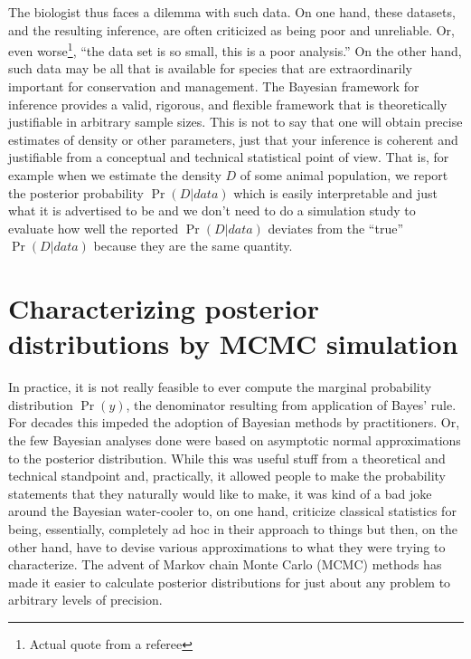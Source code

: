 The biologist thus faces a dilemma with such data. On one hand, these
datasets, and the resulting inference, are often criticized as being
poor and unreliable. Or, even worse\footnote{Actual quote from a
  referee}, ``the data set is so small, this is a poor analysis.''  On
the other hand, such data may be all that is available for species
that are extraordinarily important for conservation and management.
The Bayesian framework for inference provides a valid, rigorous, and
flexible framework that is theoretically justifiable in arbitrary
sample sizes. This is not to say that one will obtain precise
estimates of density or other parameters, just that your inference is
coherent and justifiable from a conceptual and technical statistical
point of view. That is, for example when we estimate the density $D$ of some animal population, we report the posterior probability
$\Pr(D|data)$ which is easily interpretable and just what it is
advertised to be and we don't need to do a simulation study to
evaluate how well the reported $\Pr(D|data)$ deviates from the
``true'' $\Pr(D|data)$ because they are the same quantity.

\section{Characterizing posterior distributions by MCMC simulation}

In practice, it is not really feasible to ever compute the marginal
probability distribution $\Pr(y)$, the denominator resulting from
application of Bayes' rule. For decades this impeded the adoption of
Bayesian methods by practitioners. Or, the few Bayesian analyses done
were based on asymptotic normal approximations to the posterior
distribution. While this was useful stuff from a theoretical and
technical standpoint and, practically, it allowed people to make the
probability statements that they naturally would like to make, it was
kind of a bad joke around the Bayesian water-cooler to, on one hand,
criticize classical statistics for being, essentially, completely ad
hoc in their approach to things but then, on the other hand, have to
devise various approximations to what they were trying to
characterize. The advent of Markov chain Monte Carlo (MCMC) methods
has made it easier to calculate posterior distributions for just about
any problem to arbitrary levels of precision.

